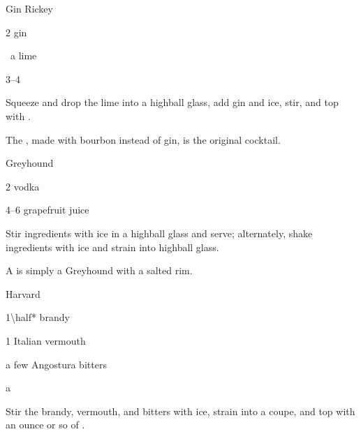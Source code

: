 \begin{Cocktail}{Gin Rickey}
  \begin{Ingredients}
  \item \SI{2}{\oz} gin
  \item \half\ a lime
  \item \SIrange{3}{4}{\oz} \soda
  \end{Ingredients}
  
  \begin{Instructions}
	Squeeze and drop the lime into a highball glass, add gin and ice, stir, and top with \soda.
	
	The , made with bourbon instead of gin, is the original  cocktail.
  \end{Instructions}
\end{Cocktail}

\begin{Cocktail}{Greyhound}
  \begin{Ingredients}
  \item \SI{2}{\oz} vodka
  \item \SIrange{4}{6}{\oz} grapefruit juice
  \end{Ingredients}
  
  \begin{Instructions}
	Stir ingredients with ice in a highball glass and serve; alternately, shake ingredients with ice and strain into highball glass.
	
	A  is simply a Greyhound with a salted rim.
  \end{Instructions}
\end{Cocktail}

\begin{Cocktail}{Harvard}
  \begin{Ingredients}
  \item \SI{1\half*}{\oz} brandy
  \item \SI{1}{\oz} Italian vermouth
  \item a few \si{\dashes} Angostura bitters
  \item a \si{\splash} \soda
  \end{Ingredients}
  
  \begin{Instructions}
	Stir the brandy, vermouth, and bitters with ice, strain into a coupe, and top with an ounce or so of \soda.
  \end{Instructions}
\end{Cocktail}

